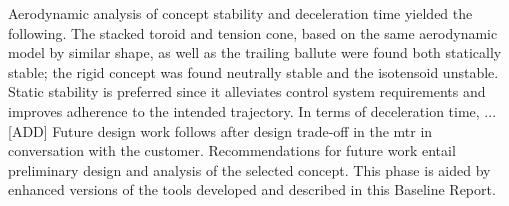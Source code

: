 \newline
\newline
Aerodynamic analysis of concept stability and deceleration time yielded the following. The stacked toroid and tension cone, based on the same aerodynamic model by similar shape, as well as the trailing ballute were found both statically stable; the rigid concept was found neutrally stable and the isotensoid unstable. Static stability is preferred since it alleviates control system requirements and improves adherence to the intended trajectory. In terms of deceleration time, ... [ADD]
\newline
\newline
Future design work follows after design trade-off in the \acrfull{mtr} in conversation with the customer. Recommendations for future work entail preliminary design and analysis of the selected concept. This phase is aided by enhanced versions of the tools developed and described in this Baseline Report. 



